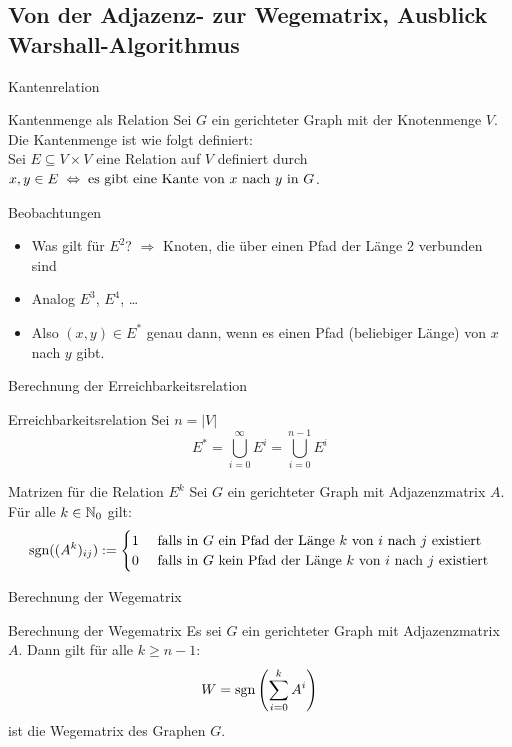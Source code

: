 \subsection{Von der Adjazenz- zur Wegematrix, Ausblick Warshall-Algorithmus}
\begin{frame}{Kantenrelation}
	\begin{block}{Kantenmenge als Relation}
		Sei $G$ ein gerichteter Graph mit der Knotenmenge $V$. Die Kantenmenge ist wie folgt definiert:\\
		Sei $E \subseteq V \times V$ eine Relation auf $V$ definiert durch $x,y \in E \gdw \text{es gibt eine Kante von $x$ nach }y \text{ in } G$.
	\end{block}

	\begin{exampleblock}{Beobachtungen}
		\begin{itemize}
			\item Was gilt für $E^2$? \pause $\Rightarrow$ Knoten, die über einen Pfad der Länge 2 verbunden sind
			\item Analog $E^3$, $E^4$, \dots
			\item Also $(x,y) \in E^*$ genau dann, wenn es einen Pfad (beliebiger Länge) von $x$ nach $y$ gibt.
		\end{itemize}
	\end{exampleblock}
\end{frame}

\begin{frame}{Berechnung der Erreichbarkeitsrelation}
    \begin{block}{Erreichbarkeitsrelation}
        Sei $n = |V|$
    	\[
    		E^* = \bigcup_{i=0}^{\infty} E^i = \bigcup_{i=0}^{n-1} E^i
    	\]
    \end{block}

    \begin{block}{Matrizen für die Relation $E^k$}
    	Sei $G$ ein gerichteter Graph mit Adjazenzmatrix $A$. Für alle $k \in \mathbb{N}_0$ gilt:\\
    	\[
    		\mathop{\text{sgn}}((A^k)_{ij}):=
    		\begin{cases}
      		1 & \text{ falls in $G$ ein Pfad der Länge $k$ von $i$ nach $j$ existiert}\\
      		0 & \text{ falls in $G$ kein Pfad der Länge $k$ von $i$ nach $j$ existiert}\\
    		\end{cases}
    	\]
    \end{block}
\end{frame}

\begin{frame}{Berechnung der Wegematrix}	
    \begin{block}{Berechnung der Wegematrix}
    	Es sei $G$ ein gerichteter Graph mit Adjazenzmatrix $A$. Dann gilt für alle $k\geq n-1$: 
    	\[
    		W = \mathop{\text{sgn}}\left(\sum_{i=0}^{k} A^i\right) 
    	\]
    	ist die Wegematrix des Graphen $G$.
    \end{block}
\end{frame}